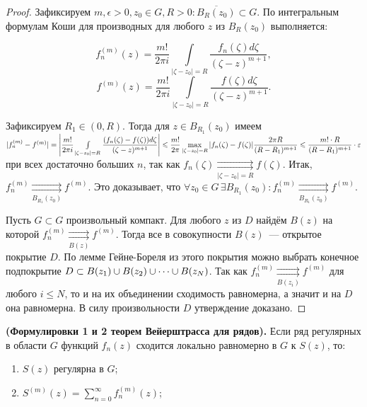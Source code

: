 \begin{proof}
    Зафиксируем \(m, \epsilon > 0, z_0 \in G, R > 0\colon \overline{B_R(z_0)} \subset G\). По
    интегральным формулам Коши для производных для любого \(z\) из \(B_R(z_0)\) выполняется:

    \[f_n^{(m)}(z) = \dfrac{m!}{2 \pi i} \int\limits_{|\zeta - z_0| = R} \dfrac{f_n(\zeta) d\zeta}
    {(\zeta - z)^{m+1}},\]
    \[f^{(m)}(z) = \dfrac{m!}{2 \pi i} \int\limits_{|\zeta - z_0| = R} \dfrac{f(\zeta) d\zeta}
    {(\zeta - z)^{m+1}}.\]

    Зафиксируем \(R_1 \in (0, R)\). Тогда для \(z \in B_{R_1}(z_0)\) имеем \(|f_n^{(m)} - f^{(m)}|
    \hm= \left|\dfrac{m!}{2 \pi i} \int\limits_{|\zeta - z_0| = R} \dfrac{(f_n(\zeta) - f(\zeta))
    d\zeta}{(\zeta - z)^{m+1}}\right| \le \dfrac{m!}{2\pi} \max\limits_{|\zeta - z_0| = R} |f_n
    (\zeta) - f(\zeta)| \dfrac{2\pi R}{(R-R_1)^{m+1}} \le \dfrac{m! \cdot R}{(R-R_1)^{m+1}} \cdot
    \epsilon\) при всех достаточно больших \(n\), так как \(f_n(\zeta)
    \mathrel{\mathop{\rightrightarrows}\limits_{|\zeta - z_0| = R}} f(\zeta)\). Итак, \(f_n^{(m)}
    \mathrel{\mathop{\rightrightarrows}\limits_{B_{R_1}(z_0)}} f^{(m)}\). Это доказывает, что
    \(\forall z_0 \in G \, \exists B_{R_1}(z_0)\colon f_n^{(m)}
    \mathrel{\mathop{\rightrightarrows}\limits_{B_{R_1}(z_0)}} f^{(m)}\).

    Пусть \(G \subset G\) произвольный компакт. Для любого \(z\) из \(D\) найдём \(B(z)\) на которой
    \(f_n^{(m)} \mathrel{\mathop{\rightrightarrows}\limits_{B(z)}} f^{(m)}\). Тогда все в
    совокупности \(B(z)\)~--- открытое покрытие \(D\). По лемме Гейне-Бореля из этого покрытия можно
    выбрать конечное подпокрытие \(D \subset B(z_1) \cup B(z_2) \hm\cup \dots \cup B(z_N)\). Так как
    \(f_n^{(m)} \mathrel{\mathop{\rightrightarrows}\limits_{B(z_i)}} f^{(m)}\) для любого
    \(i \le N\), то и на их объединении сходимость равномерна, а значит и на \(D\) она равномерна.
    В силу произвольности \(D\) утверждение доказано.
\end{proof}

\begin{note}
    \textbf{(Формулировки 1 и 2 теорем Вейерштрасса для рядов).} Если ряд регулярных в области \(G\)
    функций \(f_n(z)\) сходится локально равномерно в \(G\) к \(S(z)\), то:
    \begin{enumerate}[wide=20pt, label=\arabic*., itemsep=0ex]
        \item \(S(z)\) регулярна в \(G\);
        \item \(S^{(m)}(z) = \sum\limits_{n = 0}^\infty f_n^{(m)}(z)\);
    \end{enumerate}
\end{note}


